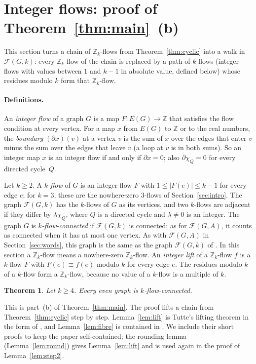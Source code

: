 \documentclass[11pt]{article}
\newtheorem{theorem}{Theorem}[section]
\theoremstyle{definition}
\newcommand{\Z}{\mathbb{Z}}
\newcommand{\cF}{\mathcal{F}}
\begin{document}
\section{Integer flows: proof of Theorem~\ref{thm:main}~(b)}\label{sec:int}

This section turns a chain of $\Z_k$-flows from Theorem~\ref{thm:cyclic}
into a walk in $\cF(G,k)$: every $\Z_k$-flow of the chain is replaced by a path of $k$-flows (integer flows with values between $1$ and $k-1$ in absolute value, defined below) whose residues modulo $k$
form that $\Z_k$-flow.

\paragraph{Definitions.} An \emph{integer flow} of a graph $G$ is a map $F\colon E(G)\to\Z$ that satisfies the flow condition at every vertex. For a map $x$ from $E(G)$ to $\Z$ or to the real numbers, the \emph{boundary}
$(\partial x)(v)$ at a vertex $v$ is the sum of $x$ over the edges that enter $v$ minus the sum over the edges that
leave $v$ (a loop at $v$ is in both sums). So an integer map $x$ is an integer flow if and only if $\partial x=0$; also $\partial\chi_Q=0$ for every directed cycle~$Q$.

Let $k\ge 2$. A \emph{$k$-flow} of $G$ is an integer flow $F$ with $1\le|F(e)|\le k-1$ for every edge $e$; for $k=3$, these are the nowhere-zero $3$-flows of Section~\ref{sec:intro}. The graph
$\cF(G,k)$ has the $k$-flows of $G$ as its vertices, and two $k$-flows are adjacent if they differ by $\lambda\chi_Q$,
where $Q$ is a directed cycle and $\lambda\ne 0$ is an integer. The graph $G$ is \emph{$k$-flow-connected} if $\cF(G,k)$ is
connected; as for $\cF(G,A)$, it counts as connected when it has at most one vertex. As with $\cF(G,A)$ in Section~\ref{sec:words}, this graph is the same as the graph $\cF(G,k)$ of
\cite{CLSWX,EHLMNS}. In this section a $\Z_k$-flow means a nowhere-zero $\Z_k$-flow. An \emph{integer lift} of a $\Z_k$-flow $f$ is a $k$-flow $F$ with $F(e)\equiv f(e)$
modulo $k$ for every edge $e$. The residues modulo $k$ of a $k$-flow form a $\Z_k$-flow, because no value of a
$k$-flow is a multiple of $k$.

\begin{theorem}\label{thm:int}
Let $k\ge 4$. Every even graph is $k$-flow-connected.
\end{theorem}

This is part~(b) of Theorem~\ref{thm:main}. The proof lifts a chain from Theorem~\ref{thm:cyclic} step by step.
Lemma~\ref{lem:lift} is Tutte's lifting theorem in the form of \cite[Theorem~2.3]{EHLMNS}, and Lemma~\ref{lem:fibre}
is contained in \cite[Lemma~5.5]{EHLMNS}. We include their short proofs to keep the paper self-contained; the rounding lemma
(Lemma~\ref{lem:round}) gives Lemma~\ref{lem:lift} and is used again in the proof of Lemma~\ref{lem:step2}.
\end{document}
